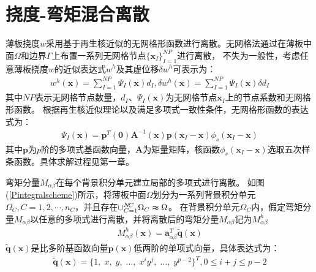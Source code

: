 \section{挠度-弯矩混合离散}
薄板挠度$w$采用基于再生核近似的无网格形函数进行离散。无网格法通过在薄板中面$\Omega$和边界$\Gamma$上布置一系列无网格节点$\{\pmb{x}_I\}^{N\!P}_{I=1}$进行离散，
不失为一般性，考虑任意薄板挠度$w$的近似表达式$w^h$及其虚位移$\delta w^h$可表示为：
\begin{equation}\label{w}
\begin{split}
    w^h(\pmb{x})=\sum_{I=1}^{N\!P}\Psi_I(\pmb{x})d_{I},\delta w^h(\pmb{x})=\sum_{I=1}^{N\!P}\Psi_I(\pmb{x})\delta d_I
\end{split}
\end{equation}
其中$N\!P$表示无网格节点数量，$d_I$、$\Psi_I(\pmb{x})$为无网格节点$\pmb{x}_I$上的节点系数和无网格形函数。
根据再生核近似理论\cite{}以及满足多项式一致性条件，无网格形函数的表达式为：
\begin{equation}
\begin{split}
    \Psi_I(\pmb{x})=\pmb{p}^T(\pmb{0})\pmb{A}^{-1}(\pmb{x})\pmb{p}(\pmb{x}_I-\pmb{x})\phi_s(\pmb{x}_I-\pmb{x})
\end{split}
\end{equation}
其中$\pmb{p}$为$p$阶的多项式基函数向量，$\pmb{A}$为矩量矩阵，核函数$\phi_s(\pmb{x}_I-\pmb{x})$选取五次样条函数。具体求解过程见第一章。\par
弯矩分量$M_{\alpha\beta}$在每个背景积分单元建立局部的多项式进行离散。
如图(\ref{Pintegralscheme})所示，将薄板中面$\Omega$划分为一系列背景积分单元$\Omega_C,C=1,2,\dotsb,n_C$，并且存在$\cup_{C=1}^{N\!C}\Omega_C\thickapprox\Omega$。
在背景积分单元$\Omega_C$内，假定弯矩分量$M_{\alpha\beta}$以任意的多项式进行离散，并将离散后的弯矩分量$M_{\alpha\beta}$记为$M_{\alpha\beta}^h$
\begin{equation}\label{moment}
\begin{split}
    M^h_{\alpha\beta}(\pmb{x})=\pmb{a}_{\alpha\beta}^T\tilde{\pmb{q}}(\pmb{x})
\end{split}
\end{equation}
$\tilde{\pmb{q}}(\pmb{x})$是比多阶基函数向量$\pmb{p}(\pmb{x})$低两阶的单项式向量，具体表达式为：
\begin{equation}
\begin{split}
    \tilde{\pmb{q}}(\pmb{x})=\{1,\;x,\;y,\;\dots,\;x^iy^j,\;\dots,\;y^{p-2}\}^T,0 \le i+j \le p-2
\end{split}
\end{equation}\par
